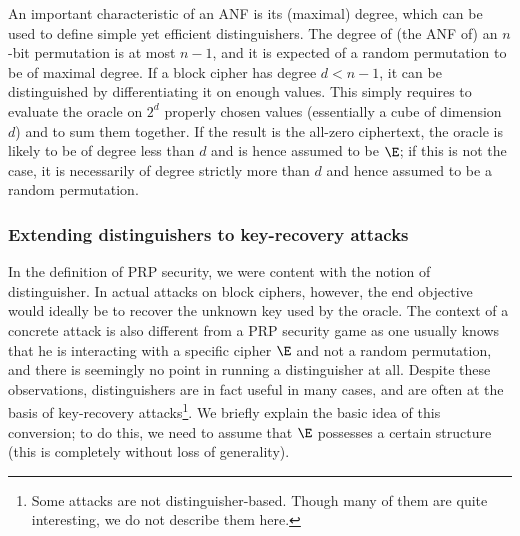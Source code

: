 An important characteristic of an ANF is its (maximal) degree, which can be used to define simple yet efficient distinguishers. The degree
of (the ANF of) an $n$-bit permutation is at most $n - 1$, and it is expected of a random permutation to be of maximal degree. If a block cipher
has degree $d < n - 1$, it can be distinguished by differentiating it on enough values. This simply requires to evaluate the oracle on $2^d$ properly chosen
values (essentially a cube of dimension $d$) and to sum them together. If the result is the all-zero ciphertext, the oracle is likely to be of degree less than
$d$ and is hence assumed to be $\E$; if this is not the case, it is necessarily of degree strictly more than $d$ and hence assumed to be a random permutation.

\subsubsection{Extending distinguishers to key-recovery attacks}

In the definition of PRP security, we were content with the notion of distinguisher. In actual attacks on block ciphers, however, the end objective
would ideally be to recover the unknown key used by the oracle. The context of a concrete attack is also different from a PRP security game as one usually knows that he is interacting with a specific
cipher $\E$ and not a random permutation, and there is seemingly no point in running a distinguisher at all.
Despite these observations, distinguishers are in fact useful in many cases, and are often at the basis of key-recovery attacks\footnote{Some attacks
are not distinguisher-based. Though many of them are quite interesting, we do not describe them here.}. We briefly explain
the basic idea of this conversion; to do this, we need to assume that $\E$ possesses a certain structure (this is completely without loss of generality).

